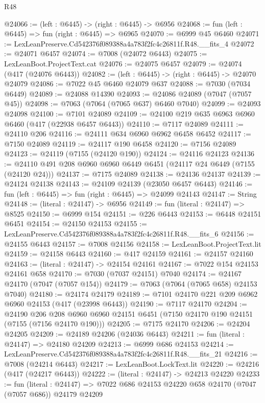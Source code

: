 \begin{lexlean}{R48}
\begin{coremodule}
@24066 := (left : @6445) -> (right : @6445) -> @6956
@24068 := fun (left : @6445) => fun (right : @6445) => @6965
@24070 := @6999 @45 @6460
@24071 := LexLeanPreserve.Cd542376f089388a4a783f2fc4c26811f.R48.__fits_4
@24072 := @24071 @6457
@24074 := @7008 (@24072 @6443)
@24075 := LexLeanBoot.ProjectText.cat
@24076 := @24075 @6457
@24079 := @24074 (@417 (@24076 @6443))
@24082 := (left : @6445) -> (right : @6445) -> @24070 @24079
@24086 := @7022 @45 @6460 @24079 @637
@24088 := @7030 (@7034 @6449)
@24089 := @24088 @14390
@24093 := @24086 @24089 (@7047 (@7057 @45))
@24098 := @7063 (@7064 (@7065 @637) @6460 @7040)
@24099 := @24093 @24098
@24100 := @7101 @24089
@24109 := @24100 @219 @635 @6963 @6960 @6460 (@417 (@22938 @6457 @6443))
@24110 := @7117 @24089
@24111 := @24110 @206
@24116 := @24111 @634 @6960 @6962 @6458 @6452
@24117 := @7150 @24089
@24119 := @24117 @190 @6458
@24120 := @7156 @24089
@24123 := @24119 (@7155 (@24120 @190))
@24124 := @24116 @24123
@24136 := @24110 @491 @208 @6960 @6960 @6449 @6451 (@24117 @24 @6449 (@7155 (@24120 @24)))
@24137 := @7175 @24089
@24138 := @24136 @24137
@24139 := @24124 @24138
@24143 := @24109 @24139 (@23050 @6457 @6443)
@24146 := fun (left : @6445) => fun (right : @6445) => @24099 @24143
@24147 := String
@24148 := (literal : @24147) -> @6956
@24149 := fun (literal : @24147) => @8525
@24150 := @6999 @154
@24151 := @226 @6443
@24153 := @6448 @24151 @6451
@24154 := @24150 @24153
@24155 := LexLeanPreserve.Cd542376f089388a4a783f2fc4c26811f.R48.__fits_6
@24156 := @24155 @6443
@24157 := @7008 @24156
@24158 := LexLeanBoot.ProjectText.lit
@24159 := @24158 @6443
@24160 := @417 @24159
@24161 := @24157 @24160
@24163 := (literal : @24147) -> @24154 @24161
@24167 := @7022 @154 @24153 @24161 @658
@24170 := @7030 (@7037 @24151) @7040
@24174 := @24167 @24170 (@7047 (@7057 @154))
@24179 := @7063 (@7064 (@7065 @658) @24153 @7040)
@24180 := @24174 @24179
@24189 := @7101 @24170 @221 @209 @6962 @6960 @24153 (@417 (@23998 @6443))
@24190 := @7117 @24170
@24204 := @24190
    @206
    @208
    @6960
    @6960
    @24151
    @6451
    (@7150 @24170 @190 @24151 (@7155 (@7156 @24170 @190)))
@24205 := @7175 @24170
@24206 := @24204 @24205
@24209 := @24189 @24206 (@24036 @6443)
@24211 := fun (literal : @24147) => @24180 @24209
@24213 := @6999 @686 @24153
@24214 := LexLeanPreserve.Cd542376f089388a4a783f2fc4c26811f.R48.__fits_21
@24216 := @7008 (@24214 @6443)
@24217 := LexLeanBoot.LockText.lit
@24220 := @24216 (@417 (@24217 @6443))
@24222 := (literal : @24147) -> @24213 @24220
@24233 := fun (literal : @24147) =>
  @7022 @686 @24153 @24220 @658 @24170 (@7047 (@7057 @686)) @24179 @24209

\end{coremodule}
\end{lexlean}
